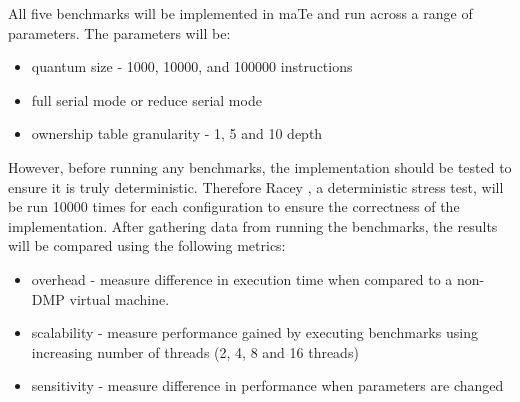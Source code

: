 All five benchmarks will be implemented in maTe and run across a range
of parameters.  The parameters will be:

\begin{itemize}
\item quantum size - 1000, 10000, and 100000 instructions

\item full serial mode or reduce serial mode

\item ownership table granularity - 1, 5 and 10 depth
\end{itemize}

However, before running any benchmarks, the implementation should be
tested to ensure it is truly deterministic.  Therefore Racey
\cite{racey}, a deterministic stress test, will be run 10000 times for
each configuration to ensure the correctness of the implementation.
After gathering data from running the benchmarks, the results will be
compared using the following metrics:

\begin{itemize}
\item overhead - measure difference in execution time when compared to
  a non-DMP virtual machine.

\item scalability - measure performance gained by executing benchmarks
  using increasing number of threads (2, 4, 8 and 16 threads)

\item sensitivity - measure difference in performance when parameters
  are changed
\end{itemize}
